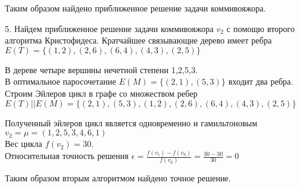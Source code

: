 \documentclass[a4paper,10pt]{article} %
\begin{document}
\smallskip

Таким образом найдено приближенное решение задачи коммивояжора.

\bigskip

5. \qquad Найдем приближенное решение задачи коммивояжора $v_2$ с помощю второго алгоритма Кристофидеса.
Кратчайшее связывающие дерево имеет ребра
$E(T) = \{ (1,2), (2,6), (6,4), (4,3),(2,5) \}  $

В дереве четыре вершины нечетной степени 1,2,5,3. \\
В оптимальное паросочетание $E(M) = \{(2,1), (5,3)\}$ входит два ребра.
Строим Эйлеров цикл в графе со множеством ребер \\
$E(T) || E(M) = \{ (2,1),(5,3),(1,2),(2,6), (6,4), (4,3),(2,5) \} $

\smallskip 

Полученный эйлеров цикл является одновременно и гамильтоновым
$v_2 = \mu = (1,2,5,3,4,6,1) $ \\
Вес цикла $f(v_2) = 30$. \\
Относительная точность решения $ \epsilon = \frac{f(v_1) - f(v_0)}{f(v_0)} = \frac{30 - 30}{30} = 0$ \\

\smallskip

Таким образом вторым алгоритмом найдено точное решение.
\end{document}
